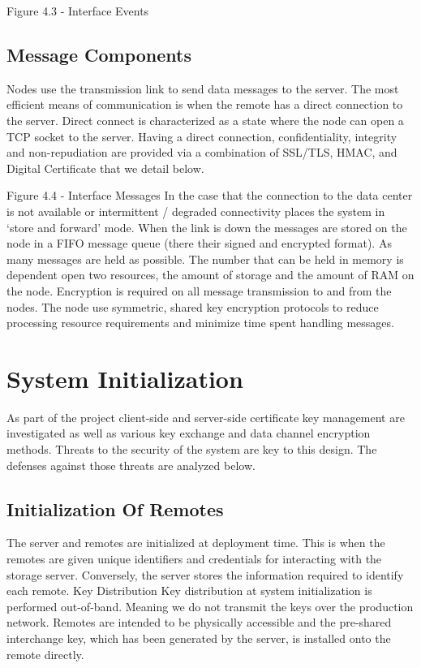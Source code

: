    Figure 4.3 - Interface Events
\subsection{Message Components}
   Nodes use the transmission link to send data messages to the server. The most efficient means of communication is when the remote has a direct connection to the server. Direct connect is characterized as a state where the node can open a TCP socket to the server. Having a direct connection, confidentiality, integrity and non-repudiation are provided via a combination of SSL/TLS, HMAC, and Digital Certificate that we detail below.
    
    Figure 4.4 - Interface Messages
In the case that the connection to the data center is not available or intermittent / degraded connectivity places the system in ‘store and forward’ mode. 
When the link is down the messages are stored on the node in a FIFO message queue (there their signed and encrypted format). As many messages are held as possible. The number that can be held in memory is dependent open two resources, the amount of storage and the amount of RAM on the node.
Encryption is required on all message transmission to and from the nodes. The node use symmetric, shared key encryption protocols to reduce processing resource requirements and minimize time spent handling messages. 

\section{System Initialization}
    As part of the project client-side and server-side certificate key management are investigated as well as various key exchange and data channel encryption methods. Threats to the security of the system are key to this design. The defenses against those threats are analyzed below.
\subsection{Initialization Of Remotes}
    The server and remotes are initialized at deployment time. This is when the remotes are given unique identifiers and credentials for interacting with the storage server. Conversely, the server stores the information required to identify each remote.  
    Key Distribution
    Key distribution at system initialization is performed out-of-band. Meaning we do not transmit the keys over the production network. Remotes are intended to be physically accessible and the pre-shared interchange key, which has been generated by the server, is installed onto the remote directly.
